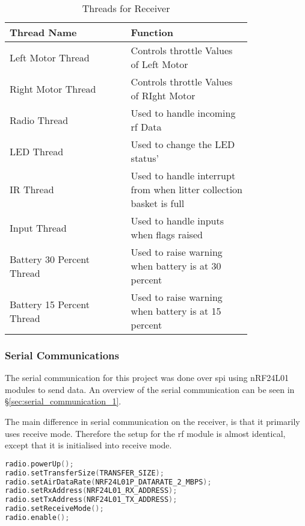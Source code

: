 \documentclass [11pt]{article}
\begin{document}
\begin{table}[H]
\centering
\setlength{\arrayrulewidth}{1.5pt}
\begin{tabular}{|p{0.4\linewidth}|p{0.4\linewidth}|}
\hline
\cellcolor{gray!40}Thread Name & \cellcolor{gray!40}Function \\ 
\hline
\cellcolor{gray!20}Left Motor Thread & \cellcolor{gray!20}Controls throttle Values of Left Motor\\
\hline
\cellcolor{gray!20}Right Motor Thread & \cellcolor{gray!20}Controls throttle Values of RIght Motor\\
\hline
\cellcolor{gray!20}Radio Thread & \cellcolor{gray!20}Used to handle incoming \gls{rf} Data\\
\hline
\cellcolor{gray!20}LED Thread & \cellcolor{gray!20}Used to change the LED status'\\
\hline
\cellcolor{gray!20}IR Thread & \cellcolor{gray!20}Used to handle interrupt from when litter collection basket is full\\
\hline
\cellcolor{gray!20}Input Thread & \cellcolor{gray!20}Used to handle inputs when flags raised\\
\hline
\cellcolor{gray!20}Battery 30 Percent Thread & \cellcolor{gray!20}Used to raise warning when battery is at 30 percent\\
\hline
\cellcolor{gray!20}Battery 15 Percent Thread & \cellcolor{gray!20}Used to raise warning when battery is at 15 percent\\
\hline
\end{tabular}
\caption{Threads for Receiver}
\label{table:threads_for_reciever}
\end{table}

\subsubsection{Serial Communications}

The serial communication for this project was done over \gls{spi} using nRF24L01 modules to send data. An overview of the serial communication can be seen in §\ref{sec:serial_communication_1}.

The main difference in serial communication on the receiver, is that it primarily uses receive mode. Therefore the setup for the \gls{rf} module is almost identical, except that it is initialised into receive mode. 

\begin{lstlisting}[language=C++,label=code:nRF24L01_SETUP_receiver,caption=nRF24L01 Set Up Receive Mode]
radio.powerUp();
radio.setTransferSize(TRANSFER_SIZE);
radio.setAirDataRate(NRF24L01P_DATARATE_2_MBPS);
radio.setRxAddress(NRF24L01_RX_ADDRESS);
radio.setTxAddress(NRF24L01_TX_ADDRESS);
radio.setReceiveMode();
radio.enable();
\end{lstlisting} 
\end{document}

